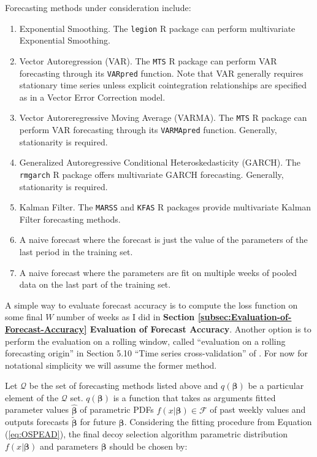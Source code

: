 \documentclass[english]{article}
\begin{document}
Forecasting methods under consideration include:
\begin{enumerate}
\item Exponential Smoothing. The \texttt{legion} R package can perform multivariate
Exponential Smoothing.
\item Vector Autoregression (VAR). The \texttt{MTS} R package can perform
VAR forecasting through its \texttt{VARpred} function. Note that VAR
generally requires stationary time series unless explicit cointegration
relationships are specified as in a Vector Error Correction model.
\item Vector Autoreregressive Moving Average (VARMA). The \texttt{MTS} R
package can perform VAR forecasting through its \texttt{VARMApred}
function. Generally, stationarity is required.
\item Generalized Autoregressive Conditional Heteroskedasticity (GARCH).
The \texttt{rmgarch} R package offers multivariate GARCH forecasting.
Generally, stationarity is required.
\item Kalman Filter. The \texttt{MARSS} and \texttt{KFAS} R packages provide
multivariate Kalman Filter forecasting methods.
\item A naive forecast where the forecast is just the value of the parameters
of the last period in the training set.
\item A naive forecast where the parameters are fit on multiple weeks of
pooled data on the last part of the training set.
\end{enumerate}
A simple way to evaluate forecast accuracy is to compute the loss
function on some final $W$ number of weeks as I did in \textbf{Section
\ref{subsec:Evaluation-of-Forecast-Accuracy} Evaluation of Forecast
Accuracy}. Another option is to perform the evaluation on a rolling
window, called \textquotedblleft evaluation on a rolling forecasting
origin\textquotedblright{} in Section 5.10 ``Time series cross-validation''
of \cite{HyndmanAthanasopoulos2021}. For now for notational simplicity
we will assume the former method.

Let $\mathcal{Q}$ be the set of forecasting methods listed above
and $q(\boldsymbol{\beta})$ be a particular element of the $\mathcal{Q}$
set. $q(\boldsymbol{\beta})$ is a function that takes as arguments
fitted parameter values $\hat{\boldsymbol{\beta}}$ of parametric
PDFs $f(x|\boldsymbol{\beta})\in\mathcal{F}$ of past weekly values
and outputs forecasts $\tilde{\boldsymbol{\beta}}$ for future $\boldsymbol{\beta}$.
Considering the fitting procedure from Equation (\ref{eq:OSPEAD}),
the final decoy selection algorithm parametric distribution $f(x|\boldsymbol{\beta})$
and parameters $\boldsymbol{\beta}$ should be chosen by:
\end{document}
